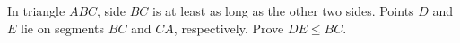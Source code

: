 In triangle $ABC$, side $BC$ is at least as long as the other two sides. Points $D$ and $E$ lie on segments $BC$ and $CA$, respectively. Prove $DE\le BC$.
